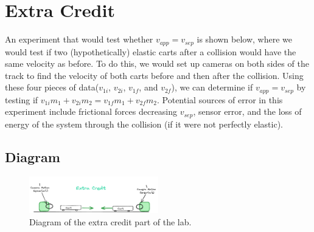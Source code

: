 \documentclass{report}
\begin{document}
\section*{Extra Credit}

An experiment that would test whether $ v_{app} = v_{sep} $ is shown below, where we would test if two (hypothetically) elastic carts after a collision would have the same velocity as before. To do this, we would set up cameras on both sides of the track to find the velocity of both carts before and then after the collision. Using these four pieces of data($v_{1i}$, $v_{2i}$, $v_{1f}$, and $v_{2f}$), we can determine if $ v_{app} = v_{sep} $ by testing if $ v_{1i}m_1 + v_{2i}m_2 = v_{1f}m_1 + v_{2f}m_2 $. Potential sources of error in this experiment include frictional forces decreasing $v_{sep} $, sensor error, and the loss of energy of the system through the collision (if it were not perfectly elastic). 

\subsection*{Diagram}

\begin{figure}[h!]
  \begin{center}
    \includegraphics[width=0.5\textwidth]{figures/extraCredit.png}
  \end{center}
  \caption{Diagram of the extra credit part of the lab.}
\end{figure}
\end{document}
